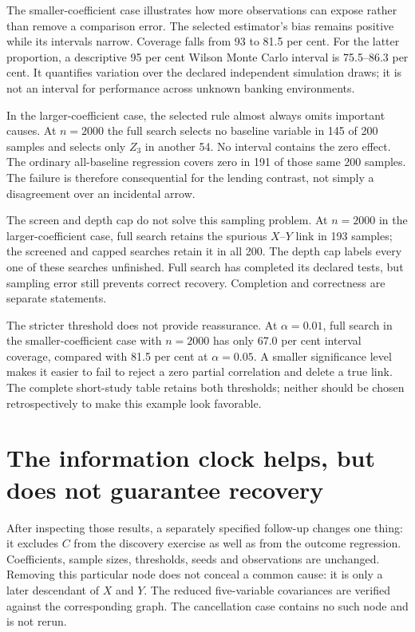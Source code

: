 The smaller-coefficient case illustrates how more observations can expose
rather than remove a comparison error. The selected estimator's bias remains
positive while its intervals narrow. Coverage falls from 93 to 81.5 per cent.
For the latter proportion, a descriptive 95 per cent Wilson Monte Carlo
interval is 75.5--86.3 per cent. It quantifies variation over the declared
independent simulation draws; it is not an interval for performance across
unknown banking environments.

In the larger-coefficient case, the selected rule almost always omits important
causes. At $n=2000$ the full search selects no baseline variable in 145 of 200
samples and selects only $Z_3$ in another 54. No interval contains the zero
effect. The ordinary all-baseline regression covers zero in 191 of those same
200 samples. The failure is therefore consequential for the lending contrast,
not simply a disagreement over an incidental arrow.

The screen and depth cap do not solve this sampling problem. At $n=2000$ in
the larger-coefficient case, full search retains the spurious $X$--$Y$ link in
193 samples; the screened and capped searches retain it in all 200. The depth
cap labels every one of these searches unfinished. Full search has completed
its declared tests, but sampling error still prevents correct recovery.
Completion and correctness are separate statements.

The stricter threshold does not provide reassurance. At $\alpha=0.01$, full
search in the smaller-coefficient case with $n=2000$ has only 67.0 per cent
interval coverage, compared with 81.5 per cent at $\alpha=0.05$. A smaller
significance level makes it easier to fail to reject a zero partial correlation and
delete a true link. The complete short-study table retains both thresholds;
neither should be chosen retrospectively to make this example look favorable.

\section{The information clock helps, but does not guarantee recovery}

After inspecting those results, a separately specified follow-up changes one
thing: it excludes $C$ from the discovery exercise as well as from the outcome
regression. Coefficients, sample sizes, thresholds, seeds and observations are
unchanged. Removing this particular node does not conceal a common cause:
it is only a later descendant of $X$ and $Y$. The reduced five-variable
covariances are verified against the corresponding graph. The cancellation
case contains no such node and is not rerun.

